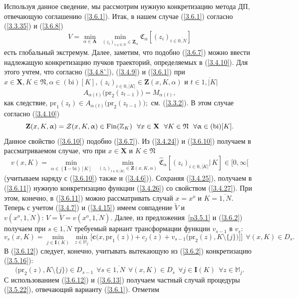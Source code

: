 \documentclass[11pt,twoside,openany]{report}
\newcommand{\bfn}{\begin{equation}}
\newcommand{\efn}{\end{equation}}
\newcommand{\ov}{\overline}
\newcommand{\al}{\alpha}
\newcommand{\sm}{\setminus}
\newcommand{\fa}{\forall}
\newcommand{\cz}{{\cal Z}}
\newcommand{\bbz}{{\mathbb Z}}
\newcommand{\bbm}{{\mathbb M}}
\begin{document}
{Используя данное сведение, мы рассмотрим нужную конкретизацию метода ДП,
отвечающую соглашению (\ref{3.6.1}). Итак, в нашем случае (\ref{3.6.1})
согласно (\ref{3.3.35}) и (\ref{3.6.8})
\bfn\label{3.6.9}V = \min\limits_{\al\in \mathbf{A}}\
\min\limits_{(z_i)_{i\in\ov{0,N}}\in \mathbf{Z}_\al} \mathfrak{C}_\al[(z_i)_{i\in\ov{0,N}}]
\efn
есть глобальный экстремум. Далее, заметим, что подобно (\ref{3.6.7}) можно
ввести надлежащую конкретизацию пучков траекторий, определяемых в (\ref{3.4.10}).
Для этого учтем, что согласно (\ref{3.4.8`}), (\ref{3.4.9}) и (\ref{3.6.1}) при
$x\in \mathbf{X}, K\in \mathfrak{N}, \al\in (\mathrm{bi})[K],
(z_i)_{i\in\ov{0,|K|}}\in \mathbf{Z}(x,K,\al)$  и $t\in \ov{1,|K|}$
$$
A_{\al(t)}\bigl(\mathrm{pr}_2(z_{t-1})\bigl) = M_{\al(t)},
$$
как следствие, $\mathrm{pr}_1(z_t)\in A_{\al(t)}\bigl(\mathrm{pr}_2(z_{t-1})\bigl);$
см. (\ref{3.3.2}). В этом случае согласно (\ref{3.4.10})
\bfn\label{3.6.10}\mathbf{Z}(x,K,\al) = \cz(x,K,\al)\in \mathrm{Fin}(\bbz_K)\ \
\fa x\in \mathbf{X}\ \ \fa K\in \mathfrak{N}\ \ \fa \al\in (\mathrm{bi})[K].
\efn
Данное свойство (\ref{3.6.10}) подобно (\ref{3.6.7}). Из (\ref{3.4.24}) и
(\ref{3.6.10}) получаем в рассматриваемом случае, что при $x\in \mathbf{X}$ и
$K\in \mathfrak{N}$
\bfn\label{3.6.11}v(x,K) = \min\limits_{\al\in (\mathbf{I}-\mathrm{bi})[K]}\ \
\min\limits_{(z_i)_{i\in\ov{0,|K|}}\in \mathbf{Z}(x,K,\al)}
\widehat{\mathfrak{C}}_\al[(z_i)_{i\in\ov{0,|K|}}|\,K]\in [0,\infty[
\efn
(учитываем наряду с (\ref{3.6.10}) также и (\ref{3.4.6})). Сохраняя
(\ref{3.4.25}), получаем в (\ref{3.6.11}) нужную конкретизацию функции
(\ref{3.4.26}) со свойством (\ref{3.4.27}). При этом, конечно, в (\ref{3.6.11})
можно рассматривать случай $x=x^o$ и $K = \ov{1,N}.$ Теперь с учетом (\ref{3.4.7})
и (\ref{3.4.15}) имеем совпадение $\widetilde{V}$ и $v(x^o,\ov{1,N}):\, V=
\widetilde{V}= v(x^o,\ov{1,N}).$ Далее, из предложения~\ref{p3.5.1}  и
(\ref{3.6.2}) получаем при $s\in \ov{1,N}$  требуемый вариант  трансформации
функции $v_{s-1}$ в $v_s:$
\bfn\label{3.6.12}v_s(x,K) = \min\limits_{j\in \mathbf{I}(K)}\
\min\limits_{z\in \bbm_j}\bigl[\mathbf{c}\bigl(x,\mathrm{pr}_1(z)\bigl) +
c_j(z) + v_{s-1}\bigl(\mathrm{pr}_2(z),K\sm\{j\}\bigl)]\bigl]\ \ \fa (x,K)
\in D_s.
\efn
В (\ref{3.6.12}) следует, конечно, учитывать вытекающую из (\ref{3.6.2})
конкретизацию  (\ref{3.5.16}):
\bfn\label{3.6.13}\bigl(\mathrm{pr}_2(z), K\sm\{j\}\bigl)\in D_{s-1}\ \
\fa s\in \ov{1,N}\ \ \fa (x,K)\in D_s\ \ \fa j\in \mathbf{I}(K)\ \ \fa z\in
\bbm_j.
\efn
С использованием (\ref{3.6.12}) и (\ref{3.6.13}) получаем частный случай
процедуры (\ref{3.5.22}), отвечающий варианту (\ref{3.6.1}). Отметим
}
\end{document}
